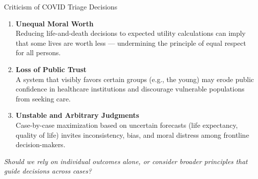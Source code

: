 \documentclass[aspectratio=169, 10pt]{beamer}
\begin{document}
\begin{frame}{Criticism of COVID Triage Decisions}

\begin{enumerate}
    \item \textbf{Unequal Moral Worth} \\
    Reducing life-and-death decisions to expected utility calculations can imply that some lives are worth less — undermining the principle of equal respect for all persons.

    \vspace{0.5em}
    \item \textbf{Loss of Public Trust} \\
    A system that visibly favors certain groups (e.g., the young) may erode public confidence in healthcare institutions and discourage vulnerable populations from seeking care.

    \vspace{0.5em}
    \item \textbf{Unstable and Arbitrary Judgments} \\
    Case-by-case maximization based on uncertain forecasts (life expectancy, quality of life) invites inconsistency, bias, and moral distress among frontline decision-makers.
\end{enumerate}

\vspace{1em}
\textit{Should we rely on individual outcomes alone, or consider broader principles that guide decisions across cases?}

\end{frame}


\end{document}
